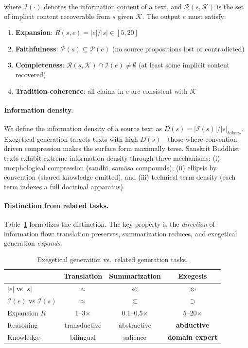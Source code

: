 \documentclass[11pt]{article}
\newcommand{\I}{\mathcal{I}}
\newcommand{\K}{\mathcal{K}}
\newcommand{\R}{\mathcal{R}}
\newcommand{\Psrc}{\mathcal{P}}
\begin{document}
\noindent where $\I(\cdot)$ denotes the information content of a text, and $\R(s, \K)$ is the set of implicit content recoverable from $s$ given $\K$. The output $e$ must satisfy:

\begin{enumerate}
    \item \textbf{Expansion}: $R(s,e) = |e|/|s| \in [5, 20]$
    \item \textbf{Faithfulness}: $\Psrc(s) \subseteq \Psrc(e)$ (no source propositions lost or contradicted)
    \item \textbf{Completeness}: $\R(s, \K) \cap \I(e) \neq \emptyset$ (at least some implicit content recovered)
    \item \textbf{Tradition-coherence}: all claims in $e$ are consistent with $\K$
\end{enumerate}

\paragraph{Information density.}
We define the information density of a source text as $D(s) = |\I(s)| / |s|_{tokens}$. Exegetical generation targets texts with high $D(s)$---those where convention-driven compression makes the surface form maximally terse. Sanskrit Buddhist texts exhibit extreme information density through three mechanisms: (i) morphological compression (sandhi, sam\=asa compounds), (ii) ellipsis by convention (shared knowledge omitted), and (iii) technical term density (each term indexes a full doctrinal apparatus).

\paragraph{Distinction from related tasks.}
Table~\ref{tab:tasks} formalizes the distinction. The key property is the \textit{direction} of information flow: translation preserves, summarization reduces, and exegetical generation \textit{expands}.

\begin{table}[t]
\centering
\small
\begin{tabular}{@{}lccc@{}}
\toprule
& \textbf{Translation} & \textbf{Summarization} & \textbf{Exegesis} \\
\midrule
$|e|$ vs $|s|$ & $\approx$ & $\ll$ & $\gg$ \\
$\I(e)$ vs $\I(s)$ & $\approx$ & $\subset$ & $\supset$ \\
Expansion $R$ & 1--3$\times$ & 0.1--0.5$\times$ & 5--20$\times$ \\
Reasoning & transductive & abstractive & \textbf{abductive} \\
Knowledge & bilingual & salience & \textbf{domain expert} \\
\bottomrule
\end{tabular}
\caption{Exegetical generation vs.\ related generation tasks.}
\label{tab:tasks}
\end{table}
\end{document}
